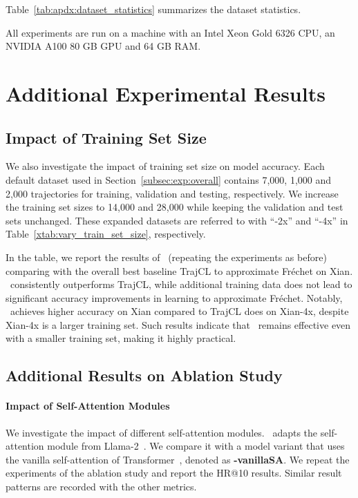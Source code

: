 Table~\ref{tab:apdx:dataset_statistics} summarizes the dataset statistics.



All experiments are run on a machine with an Intel Xeon Gold 6326 CPU, an NVIDIA A100 80 GB GPU and 64 GB RAM. 



\section{Additional Experimental Results}\label{app:exp_results}

\subsection{Impact of Training Set Size}\label{app:training_set_size}
We also investigate the impact of training set size on model accuracy. Each default dataset used in Section~\ref{subsec:exp:overall} contains 7,000, 1,000 and 2,000 trajectories for training, validation and testing, respectively. We increase the training set sizes to 14,000 and 28,000 while keeping the validation and test sets unchanged. These expanded datasets are referred to with ``-2x'' and ``-4x'' in Table~\ref{xtab:vary_train_set_size}, respectively.

In the table, we report the results of \model\ (repeating the experiments as before) comparing with the overall best baseline TrajCL to approximate Fr\'echet on Xian. \model\ consistently outperforms TrajCL, while additional training data does not lead to significant accuracy improvements in learning to approximate Fr\'echet. Notably, \model\ achieves higher accuracy on Xian compared to TrajCL does on Xian-4x, despite Xian-4x is a larger training set. Such results indicate that \model\ remains effective even with a smaller training set, making it highly practical.



\subsection{Additional Results on Ablation Study} \label{app:diff_attention}
 
\paragraph{Impact of Self-Attention Modules}
We investigate the impact of different self-attention modules.
\model\ adapts the self-attention module from Llama-2~\cite{llama2}. 
We compare it with a model variant that uses the vanilla self-attention of Transformer~\cite{transformer}, denoted as \textbf{\model-vanillaSA}. 
We repeat the experiments of the ablation study and report the HR@10 results. Similar result patterns are recorded with the other metrics.

